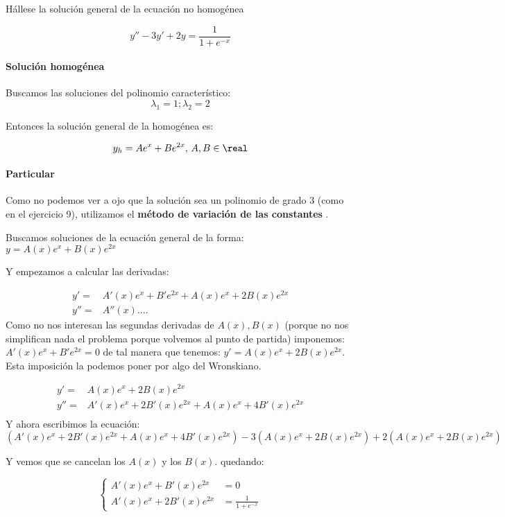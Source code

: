 \documentclass[nochap]{apuntes}
\begin{document}
\begin{problem}[14] Hállese la solución general de la ecuación no homogénea

\[ y'' - 3y' + 2y = \frac{1}{1+e^{-x}} \]

\solution

\paragraph{Solución homogénea} Buscamos las soluciones del polinomio característico:
\[\lambda_1 = 1; \lambda_2 = 2\]

Entonces la solución general de la homogénea es:

\[y_h= Ae^x + Be^{2x},\,A,B\in\real\]

\paragraph{Particular} Como no podemos ver a ojo que la solución sea un polinomio de grado 3 (como en el ejercicio 9), utilizamos el \textbf{método de variación de las constantes} .

Buscamos soluciones de la ecuación general de la forma:
$y=A(x)e^x + B(x)e^{2x}$

Y empezamos a calcular las derivadas:

\[\begin{array}{cc}
y' = &A'(x) e^x + B'e^{2x} + A(x)e^x + 2B(x)e^{2x}\\
y'' = &A''(x)....
\end{array}\]
Como no nos interesan las segundas derivadas de $A(x),B(x)$ (porque no nos simplifican nada el problema porque volvemos al punto de partida) imponemos: $A'(x) e^x + B'e^{2x} =0$ de tal manera que tenemos: $y' = A(x)e^x + 2B(x)e^{2x}$. Esta imposición la podemos poner por algo del Wronskiano.


\[\begin{array}{cc}
y' = &A(x)e^x + 2B(x)e^{2x}\\
y'' = &A'(x)e^x + 2B'(x) e^{2x} + A(x)e^x + 4B'(x)e^{2x}\\
\end{array}\]
Y ahora escribimos la ecuación:
\[\left(A'(x)e^x + 2B'(x) e^{2x} + A(x)e^x + 4B'(x)e^{2x}\right) - 3\left(A(x)e^x + 2B(x)e^{2x}\right) + 2 \left(A(x)e^x + 2B(x)e^{2x}\right)\]

Y vemos que se cancelan los $A(x)$ y los $B(x)$. quedando:

\[\left\{\begin{array}{cc}
A'(x)e^x + B'(x)e^{2x} &= 0\\
A'(x)e^x + 2B'(x)e^{2x} &= \frac{1}{1+e^{-x}}
\end{array}\right.
\]


\end{problem}
\end{document}
